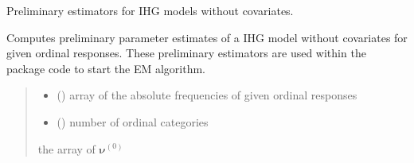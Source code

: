 \documentclass[letterpaper,10pt,english]{sphinxmanual}
\begin{document}
\begin{fulllineitems}
\label{\detokenize{cubmods:cubmods.ihg_v.init_theta}}
\pysigstartsignatures
{}
\pysigstopsignatures
\sphinxAtStartPar
Preliminary estimators for IHG models without covariates.

\sphinxAtStartPar
Computes preliminary parameter estimates of a IHG model without covariates for given ordinal
responses. These preliminary estimators are used within the package code to start the E\sphinxhyphen{}M algorithm.
\begin{quote}\begin{description}
\begin{itemize}
\item {} 
\sphinxAtStartPar
{} () \textendash{} array of the absolute frequencies of given ordinal responses

\item {} 
\sphinxAtStartPar
{} () \textendash{} number of ordinal categories

\end{itemize}

\sphinxAtStartPar
the array of \(\pmb\nu^{(0)}\)

\end{description}\end{quote}

\end{fulllineitems}

\end{document}

